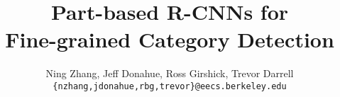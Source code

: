 \documentclass[runningheads]{llncs}
\begin{document}
\newcommand{\todo}[1]{{\color{red} {\bf TODO:} \it #1}}
\newcommand{\ning}[1]{{\color{blue}{\bf Ning:} \it #1}}
\renewcommand{\tabcolsep}{0.2cm}

\pagestyle{headings}
\mainmatter

\title{Part-based R-CNNs for \\ Fine-grained Category Detection}



\author{Ning Zhang, Jeff Donahue, Ross Girshick, Trevor Darrell\\
\texttt{\{nzhang,jdonahue,rbg,trevor\}@eecs.berkeley.edu}}

\maketitle

\begin{abstract}


\end{abstract}











\newpage


\end{document}
